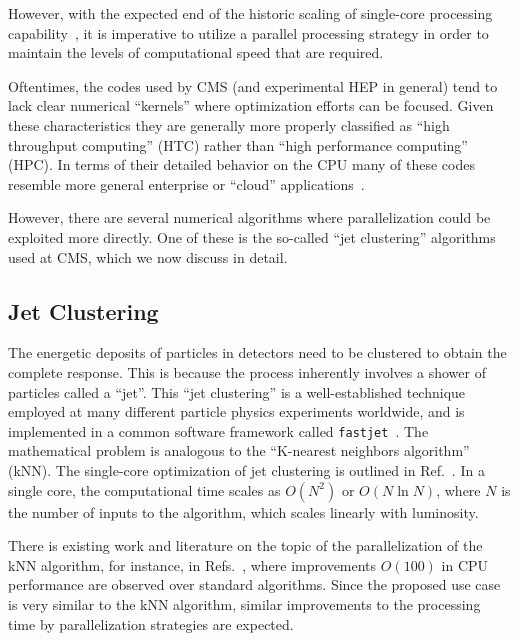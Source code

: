 \documentclass[12pt]{article}
\begin{document}
However, with the expected end of the historic scaling of single-core
processing capability~\cite{GAMEOVER}, it is imperative to utilize a
parallel processing
strategy in order to maintain the levels of computational speed that
are required.

Oftentimes,
the codes used by CMS (and experimental HEP in general) tend to lack
clear numerical ``kernels'' where optimization efforts can be focused. 
Given these characteristics they are generally more properly classified as
``high throughput computing'' (HTC) rather than ``high performance computing'' (HPC). 
In terms of their detailed behavior on the CPU many of these codes resemble
more general enterprise or ``cloud''
applications~\cite{CLOUDSUITE,GOODACHEP}.

However, there are several numerical algorithms where parallelization
could be exploited more directly. One of these is the so-called ``jet
clustering'' algorithms used at CMS, which we now discuss in detail. 

 

\subsection{Jet Clustering} 




The energetic deposits of particles in detectors need to be clustered
to obtain the
complete response. This is because the process
inherently involves a shower of particles called a ``jet''. This
``jet clustering'' is a well-established technique employed at
many different particle physics experiments worldwide, and is
implemented in a common software framework called 
{\tt fastjet}~\cite{fastjet_manual}. 
The mathematical problem is analogous to the
``K-nearest neighbors algorithm''~\cite{knn_ieee} (kNN). 
The single-core optimization of
jet clustering
is outlined in Ref.~\cite{fastjet_timing}. In a single core,
the computational time scales as $O(N^2)$ or  $O(N \ln{N})$, where $N$
is the number of inputs to the algorithm, which scales linearly with
luminosity. 

There is existing work and literature on the topic of the
parallelization of the kNN algorithm, for instance, in
Refs.~\cite{knn_gpu_1, knn_gpu_2, knn_gpu_3}, where improvements
$O(100)$ in CPU performance are observed over standard
algorithms. Since the proposed use case is
very similar to the kNN algorithm, similar improvements to the
processing time by parallelization strategies are expected. 
\end{document}
